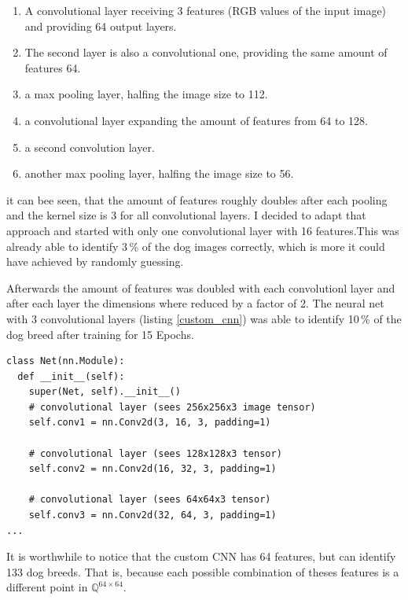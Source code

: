 \documentclass[paper=A4, DIV=10, parskip=half]{scrartcl}
\begin{document}
\begin{enumerate}
\item A convolutional layer receiving 3 features (RGB values of the input image)
and providing 64 output layers.
\item The second layer is also a convolutional one, providing the same amount of
features 64.
\item a max pooling layer, halfing the image size to 112.
\item a convolutional layer expanding the amount of features from 64 to 128.
\item a second convolution layer.
\item another max pooling layer, halfing the image size to 56.
\end{enumerate}

it can bee seen, that the amount of features roughly doubles after each pooling
and the kernel size is 3 for all convolutional layers. I decided to adapt that
approach and started with only one convolutional layer with 16 features.This was
already able to identify 3\,\% of the dog images correctly, which is more it
could have achieved by randomly guessing. 

Afterwards the amount of features was doubled with each convolutionl layer and
after each layer the dimensions where reduced by a factor of 2. The neural net
with 3 convolutional layers (listing \ref{custom_cnn}) was able to identify
10\,\% of the dog breed after training for 15 Epochs.

\begin{lstlisting}[caption=Custom Design CNN, label=custom_cnn]
class Net(nn.Module):
  def __init__(self):
    super(Net, self).__init__()
    # convolutional layer (sees 256x256x3 image tensor)
    self.conv1 = nn.Conv2d(3, 16, 3, padding=1)

    # convolutional layer (sees 128x128x3 tensor)
    self.conv2 = nn.Conv2d(16, 32, 3, padding=1)

    # convolutional layer (sees 64x64x3 tensor)
    self.conv3 = nn.Conv2d(32, 64, 3, padding=1)
...
\end{lstlisting}

It is worthwhile to notice that the custom CNN has 64 features, but can identify
133 dog breeds. That is, because each possible combination of theses features
is a different point in $\mathbb{Q}^{64\times64}$.

\end{document}

